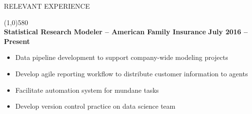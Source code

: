 \documentclass{article}
\begin{document}
\noindent \large{RELEVANT EXPERIENCE}\\ \begin{small}
\line(1,0){580}\\

	\noindent \textbf{Statistical Research Modeler -- American Family Insurance} \hfill \textbf{July 2016 -- Present}
	\begin{itemize}
		\item Data pipeline development to support company-wide modeling projects
		\item Develop agile reporting workflow to distribute customer information to agents
		\item Facilitate automation system for mundane tasks
		\item Develop version control practice on data science team
	\end{itemize}
	



\end{small}
\end{document}
